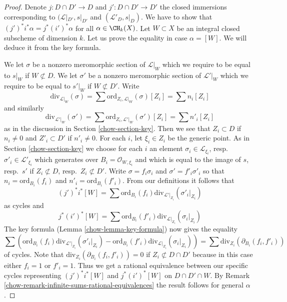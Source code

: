 \begin{proof}

Denote $j : D \cap D' \to D$ and $j' : D \cap D' \to D'$ the closed
immersions corresponding to $(\mathcal{L}|_{D'}, s|_{D'}$ and
$(\mathcal{L}'_D, s|_D)$. We have to show that
$(j')^*i^*\alpha = j^* (i')^*\alpha$ for all $\alpha \in \CH_k(X)$.
Let $W \subset X$ be an integral closed subscheme of dimension $k$.
Let us prove the equality in case $\alpha = [W]$. We will deduce
it from the key formula.

\medskip\noindent
We let $\sigma$ be a nonzero meromorphic section of $\mathcal{L}|_W$
which we require to be equal to $s|_W$ if $W \not \subset D$.
We let $\sigma'$ be a nonzero meromorphic section of $\mathcal{L}'|_W$
which we require to be equal to $s'|_W$ if $W \not \subset D'$.
Write
$$
\text{div}_{\mathcal{L}|_W}(\sigma) =
\sum \text{ord}_{Z_i, \mathcal{L}|_W}(\sigma)[Z_i] = \sum n_i[Z_i]
$$
and similarly
$$
\text{div}_{\mathcal{L}'|_W}(\sigma') =
\sum \text{ord}_{Z_i, \mathcal{L}'|_W}(\sigma')[Z_i] = \sum n'_i[Z_i]
$$
as in the discussion in Section \ref{chow-section-key}.
Then we see that $Z_i \subset D$ if $n_i \not = 0$ and
$Z'_i \subset D'$ if $n'_i \not = 0$. For each $i$, let $\xi_i \in Z_i$
be the generic point. As in Section \ref{chow-section-key} we choose
for each $i$ an element
$\sigma_i \in \mathcal{L}_{\xi_i}$, resp.\ $\sigma'_i \in \mathcal{L}'_{\xi_i}$
which generates over $B_i = \mathcal{O}_{W, \xi_i}$
and which is equal to the image of
$s$, resp.\ $s'$ if $Z_i \not \subset D$, resp.\ $Z_i \not \subset D'$.
Write $\sigma = f_i \sigma_i$ and $\sigma' = f'_i\sigma'_i$ so that
$n_i = \text{ord}_{B_i}(f_i)$ and
$n'_i = \text{ord}_{B_i}(f'_i)$.
From our definitions it follows that
$$
(j')^*i^*[W] =
\sum \text{ord}_{B_i}(f_i) \text{div}_{\mathcal{L}'|_{Z_i}}(\sigma'_i|_{Z_i})
$$
as cycles and
$$
j^*(i')^*[W] =
\sum \text{ord}_{B_i}(f'_i) \text{div}_{\mathcal{L}|_{Z_i}}(\sigma_i|_{Z_i})
$$
The key formula (Lemma \ref{chow-lemma-key-formula}) now gives the equality
$$
\sum \left(
\text{ord}_{B_i}(f_i) \text{div}_{\mathcal{L}'|_{Z_i}}(\sigma'_i|_{Z_i}) -
\text{ord}_{B_i}(f'_i) \text{div}_{\mathcal{L}|_{Z_i}}(\sigma_i|_{Z_i})
\right) =
\sum \text{div}_{Z_i}(\partial_{B_i}(f_i, f'_i))
$$
of cycles. Note that $\text{div}_{Z_i}(\partial_{B_i}(f_i, f'_i)) = 0$ if
$Z_i \not \subset D \cap D'$ because in this case either $f_i = 1$
or $f'_i = 1$. Thus we get a rational equivalence between our specific
cycles representing $(j')^*i^*[W]$ and $j^*(i')^*[W]$ on $D \cap D' \cap W$.
By Remark \ref{chow-remark-infinite-sums-rational-equivalences}
the result follows for general $\alpha$.
\end{proof}

